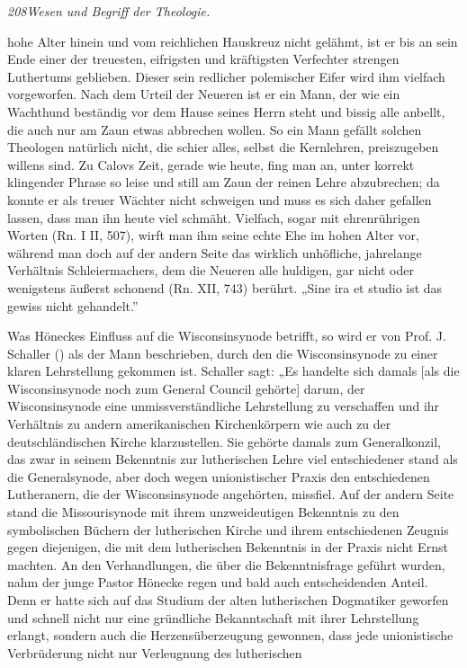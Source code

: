 \textsl{208}\hfill\textsl{Wesen und Begriff der Theologie.}\par hohe Alter hinein und vom reichlichen Hauskreuz nicht gelähmt, ist er bis an sein Ende einer der treuesten, eifrigsten und kräftigsten Verfechter strengen Luthertums geblieben. Dieser sein redlicher polemischer Eifer wird ihm vielfach vorgeworfen. Nach dem Urteil der Neueren ist er ein Mann, der wie ein Wachthund beständig vor dem Hause seines Herrn steht und bissig alle anbellt, die auch nur am Zaun etwas abbrechen wollen. So ein Mann gefällt solchen Theologen natürlich nicht, die schier alles, selbst die Kernlehren, preiszugeben willens sind. Zu Calovs Zeit, gerade wie heute, fing man an, unter korrekt klingender Phrase so leise und still am Zaun der reinen Lehre abzubrechen; da konnte er als treuer Wächter nicht schweigen und muss es sich daher gefallen lassen, dass man ihn heute viel schmäht. Vielfach, sogar mit ehrenrührigen Worten (Rn. I II, 507), wirft man ihm seine echte Ehe im hohen Alter vor, während man doch auf der andern Seite das wirklich unhöfliche, jahrelange Verhältnis Schleiermachers, dem die Neueren alle huldigen, gar nicht oder wenigstens äußerst schonend (Rn. XII, 743) berührt. „Sine ira et studio ist das gewiss nicht gehandelt.''\par Was Höneckes Einfluss auf die Wisconsinsynode betrifft, so wird er von Prof. J. Schaller () als der Mann beschrieben, durch den die Wisconsinsynode zu einer klaren Lehrstellung gekommen ist. Schaller sagt: „Es handelte sich damals [als die Wisconsinsynode noch zum General Council gehörte] darum, der Wisconsinsynode eine unmissverständliche Lehrstellung zu verschaffen und ihr Verhältnis zu andern amerikanischen Kirchenkörpern wie auch zu der deutschländischen Kirche klarzustellen. Sie gehörte damals zum Generalkonzil, das zwar in seinem Bekenntnis zur lutherischen Lehre viel entschiedener stand als die Generalsynode, aber doch wegen unionistischer Praxis den entschiedenen Lutheranern, die der Wisconsinsynode angehörten, missfiel. Auf der andern Seite stand die Missourisynode mit ihrem unzweideutigen Bekenntnis zu den symbolischen Büchern der lutherischen Kirche und ihrem entschiedenen Zeugnis gegen diejenigen, die mit dem lutherischen Bekenntnis in der Praxis nicht Ernst machten. An den Verhandlungen, die über die Bekenntnisfrage geführt wurden, nahm der junge Pastor Hönecke regen und bald auch entscheidenden Anteil. Denn er hatte sich auf das Studium der alten lutherischen Dogmatiker geworfen und schnell nicht nur eine gründliche Bekanntschaft mit ihrer Lehrstellung erlangt, sondern auch die Herzensüberzeugung gewonnen, dass jede unionistische Verbrüderung nicht nur Verleugnung des lutherischen